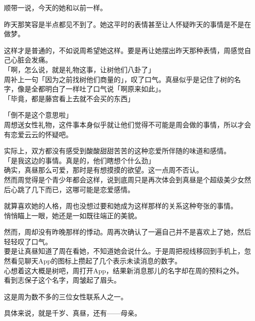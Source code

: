 顺带一说，今天的她和以前一样。

昨天那笑容是半点都见不到了。她这平时的表情甚至让人怀疑昨天的事情是不是在做梦。

这样才是普通的，不如说周希望她这样。要是再让她摆出昨天那种表情，周感觉自己心脏会发痛。\\

「啊，怎么说，就是礼物这事，让树他们八卦了」\\

周补上一句「因为之前找树他们商量的」，叹了口气。真昼似乎是记住了树的名字，像是全都明白了一样吐了口气说「啊原来如此」。\\

「毕竟，都是藤宫看上去就不会买的东西」

「倒不是这个意思啦」\\

周想送女性礼物，这件事本身似乎就让他们觉得不可能是周会做的事情，所以才会有恋爱云云的怀疑吧。

实际上，双方都没有感受到酸酸甜甜苦苦的这种恋爱所伴随的味道和感情。\\

「是我这边的事情。真是的，他们瞎想个什么劲」\\

确实，真昼那么可爱，那时是有想摸摸的欲望。这一点周不否认。\\

然而周觉得是个青少年都会这样，说到底周只是再次体会到真昼是个超级美少女然后心跳了几下而已，这哪可能是恋爱感情。

就算喜欢她的人格，周也没想过要和她成为这样那样的关系这种夸张的事情。\\

悄悄瞄上一眼，她还是一如既往端正的美貌。

然而，周却没有昨晚那样的悸动。周再次确认了一遍自己并不是喜欢上了她，然后轻轻叹了口气。\\

要是让真昼知道了周在看她，不知道她会说什么。于是周把视线移回到手机上，忽然看见聊天App的图标上攒起了几个表示未读消息的数字。\\

心想着这大概是树吧，周打开App，结果新消息那儿的名字却在周的预料之外。\\

看到志保子这个名字，周皱起了眉头。

这是周为数不多的三位女性联系人之一。

具体来说，就是千岁、真昼，还有——母亲。\\

